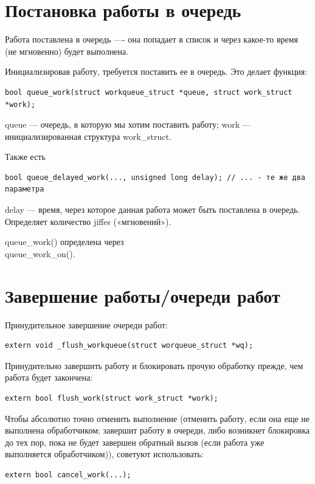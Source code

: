 \section{Постановка работы в очередь}

Работа поставлена в очередь —- она попадает в список и через какое-то время (не мгновенно) будет выполнена.

Инициализировав работу, требуется поставить ее в очередь. Это делает функция:
\begin{lstlisting}
bool queue_work(struct workqueue_struct *queue, struct work_struct *work);
\end{lstlisting}

queue — очередь, в которую мы хотим поставить работу;
work — инициализированная структура work\_struct.

Также есть
\begin{lstlisting}
bool queue_delayed_work(..., unsigned long delay); // ... - те же два параметра
\end{lstlisting}

delay — время, через которое данная работа может быть поставлена в очередь.
Определяет количество jiffes («мгновений»).

queue\_work() определена через \\ queue\_work\_on().

\section{Завершение работы/очереди работ}

Принудительное завершение очереди работ:
\begin{lstlisting}
extern void _flush_workqueue(struct worqueue_struct *wq);
\end{lstlisting}

Принудительно завершить работу и блокировать прочую обработку прежде, чем работа будет закончена:
\begin{lstlisting}
extern bool flush_work(struct work_struct *work);
\end{lstlisting}

Чтобы абсолютно точно отменить выполнение (отменить работу, если она еще не выполнена обработчиком; завершит работу в очереди, либо возникнет блокировка до тех пор, пока не будет завершен обратный вызов (если работа уже выполняется обработчиком)), советуют использовать:
\begin{lstlisting}
extern bool cancel_work(...);
\end{lstlisting}

